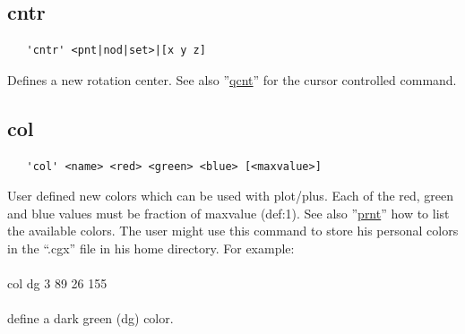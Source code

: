 \documentclass{article}
\providecommand{\htmlref}[2]{\hyperref[#2]{#1}}
\begin{document}
\subsection{\label{cntr}cntr}
\begin{verbatim}
   'cntr' <pnt|nod|set>|[x y z]
\end{verbatim}
Defines a new rotation center. See also ''\htmlref{qcnt}{qcnt}'' for the cursor controlled command.

\subsection{\label{col}col}
\begin{verbatim}
   'col' <name> <red> <green> <blue> [<maxvalue>]
\end{verbatim}
User defined new colors which can be used with plot/plus. Each of the red, green and blue values must be fraction of maxvalue (def:1). See also ''\htmlref{prnt}{prnt}'' how to list the available colors. The user might use this command to store his personal colors in the ``.cgx'' file in his home directory. For example:\\\\
col dg 3 89 26 155\\\\define a dark green (dg) color.
\end{document}
